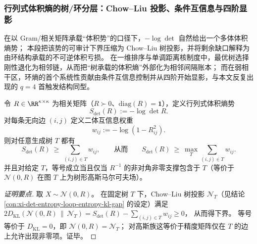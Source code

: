 \subsubsection{行列式体积熵的树/环分层：Chow--Liu 投影、条件互信息与四阶显影}\label{subsubsec:xi-det-entropy-tree-loop-hierarchy}
在以 Gram/相关矩阵承载“体积势”的口径下，\(-\log\det\) 自然给出一个多体体积熵势；
本段把该势的可审计下界压缩为 Chow--Liu 树投影，并将剩余缺口解释为由环结构承载的不可逆体积亏损。
在一维排序与单调距离核制度中，最优树选择刚性退化为相邻链，从而把“树承载的体积熵”外部化为相邻间隔账本；
而在弱相干区，环熵的首个系统性贡献由条件互信息控制并从四阶开始显影，与本文反复出现的 \(q=4\) 首触发结构同型。

\begin{conclusion}\label{con:xi-det-entropy-chow-liu-tree-lower-bound}
令 \(R\in\RR^{\kappa\times\kappa}\) 为相关矩阵（\(R\succ0\)、\(\mathrm{diag}(R)=\mathbf 1\)），定义行列式体积熵势
\[
S_{\det}(R):=-\log\det R.
\]
对每条无向边 \((i,j)\) 定义二体互信息权重
\[
w_{ij}:=-\log(1-R_{ij}^2).
\]
则对任意生成树 \(T\) 都有
\[
S_{\det}(R)\ \ge\ \sum_{(i,j)\in T} w_{ij},
\qquad\text{从而}\qquad
S_{\det}(R)\ \ge\ \max_{T}\sum_{(i,j)\in T} w_{ij}.
\]
并且对给定 \(T\)，等号成立当且仅当 \(R^{-1}\) 的非对角非零支撑包含于 \(T\)（等价于 \(\mathcal N(0,R)\) 在图 \(T\) 上为树形高斯马尔可夫场）。
\end{conclusion}
\begin{proof}[证明要点]
取 \(X\sim\mathcal N(0,R)\)。
在固定树 \(T\) 下，Chow--Liu 树投影 \(\mathcal N_T\)（见结论 \ref{con:xi-det-entropy-loop-entropy-kl-gap} 的设定）满足
\(
2D_{\mathrm{KL}}(\mathcal N(0,R)\,\|\,\mathcal N_T)
=S_{\det}(R)-\sum_{(i,j)\in T}w_{ij}\ge 0
\)，
从而得下界。
等号等价于 \(D_{\mathrm{KL}}=0\)，即 \(\mathcal N(0,R)=\mathcal N_T\)；
对高斯族这等价于精度矩阵仅在 \(T\) 的边上允许出现非零项。证毕。
\end{proof}

